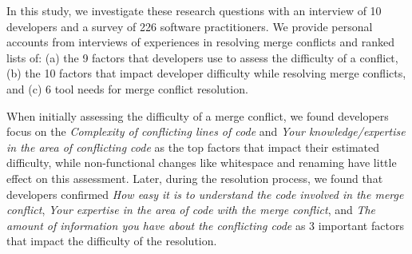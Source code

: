 In this study, we investigate these research questions with an interview of 10 developers and a survey of 226 software practitioners. We provide personal accounts from interviews of experiences in resolving merge conflicts and ranked lists of: (a) the 9 factors that developers use to assess the difficulty of a conflict, (b) the 10 factors that impact developer difficulty while resolving merge conflicts, and (c) 6 tool needs for merge conflict resolution.

When initially assessing the difficulty of a merge conflict, we found developers focus on the \textit{Complexity of conflicting lines of code} and \textit{Your knowledge/expertise in the area of conflicting code} as the top factors that impact their estimated difficulty, while non-functional changes like whitespace and renaming have little effect on this assessment. Later, during the resolution process, we found that developers confirmed \textit{How easy it is to understand the code involved in the merge conflict}, \textit{Your expertise in the area of code with the merge conflict}, and \textit{The amount of information you have about the conflicting code} as 3 important factors that impact the difficulty of the resolution.
